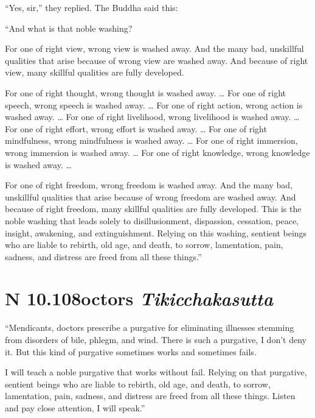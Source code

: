 \documentclass[12pt,openany]{book}%
\newcommand*{\suttatitleacronym}[1]{\smaller[2]{#1}\vspace*{.3em}}
\newcommand*{\suttatitletranslation}[1]{\linebreak{#1}}
\newcommand*{\suttatitleroot}[1]{\linebreak\smaller[2]\itshape{#1}}
\newcommand*{\tocacronym}[1]{\hspace*{-3.3em}{#1}\quad}
\newcommand*{\toctranslation}[1]{#1}
\newcommand*{\tocroot}[1]{(\textit{#1})}
\begin{document}
“Yes, sir,” they replied. The Buddha said this: 

“And what is that noble washing? 

For one of right view, wrong view is washed away. And the many bad, unskillful qualities that arise because of wrong view are washed away. And because of right view, many skillful qualities are fully developed. 

For one of right thought, wrong thought is washed away. … For one of right speech, wrong speech is washed away. … For one of right action, wrong action is washed away. … For one of right livelihood, wrong livelihood is washed away. … For one of right effort, wrong effort is washed away. … For one of right mindfulness, wrong mindfulness is washed away. … For one of right immersion, wrong immersion is washed away. … For one of right knowledge, wrong knowledge is washed away. … 

For one of right freedom, wrong freedom is washed away. And the many bad, unskillful qualities that arise because of wrong freedom are washed away. And because of right freedom, many skillful qualities are fully developed. This is the noble washing that leads solely to disillusionment, dispassion, cessation, peace, insight, awakening, and extinguishment. Relying on this washing, sentient beings who are liable to rebirth, old age, and death, to sorrow, lamentation, pain, sadness, and distress are freed from all these things.” 

%
\section*{{\suttatitleacronym AN 10.108}{\suttatitletranslation Doctors }{\suttatitleroot Tikicchakasutta}}
\addcontentsline{toc}{section}{\tocacronym{AN 10.108} \toctranslation{Doctors } \tocroot{Tikicchakasutta}}

“Mendicants, doctors prescribe a purgative for eliminating illnesses stemming from disorders of bile, phlegm, and wind. There is such a purgative, I don’t deny it. But this kind of purgative sometimes works and sometimes fails. 

I will teach a noble purgative that works without fail. Relying on that purgative, sentient beings who are liable to rebirth, old age, and death, to sorrow, lamentation, pain, sadness, and distress are freed from all these things. Listen and pay close attention, I will speak.” 
\end{document}
